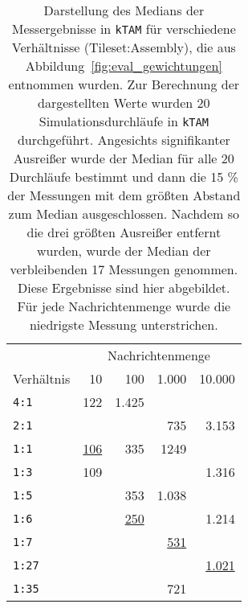 \begin{table}
    \centering
    \begin{tabular}{lrrrr}
         & \multicolumn{4}{c}{Nachrichtenmenge} \\
        Verhältnis & 10 & 100 & 1.000 & 10.000\\\hline 
        \texttt{4:1} & 122 & 1.425 &  &  \\
        \texttt{2:1} &  &  & 735 & 3.153 \\
        \texttt{1:1} & \underline{106} & 335 & 1249 &  \\
        \texttt{1:3} & 109 &  &  & 1.316 \\
        \texttt{1:5} &  & 353 & 1.038 &  \\
        \texttt{1:6} &  & \underline{250} &  & 1.214 \\
        \texttt{1:7} &  &  & \underline{531} &  \\
        \texttt{1:27} &  &  &  & \underline{1.021} \\
        \texttt{1:35} &  &  & 721 &   \\\hline
    \end{tabular}
    \caption[Simulationsergebnisse für verschiedene Gewichtungsverhältnisse]{Darstellung des Medians der Messergebnisse in \texttt{kTAM} für verschiedene Verhältnisse (Tileset:Assembly), die aus Abbildung~\ref{fig:eval_gewichtungen} entnommen wurden. Zur Berechnung der dargestellten Werte wurden 20 Simulationsdurchläufe in \texttt{kTAM} durchgeführt. Angesichts signifikanter Ausreißer wurde der Median für alle 20 Durchläufe bestimmt und dann die 15 \% der Messungen mit dem größten Abstand zum Median ausgeschlossen. Nachdem so die drei größten Ausreißer entfernt wurden, wurde der Median der verbleibenden 17 Messungen genommen. Diese Ergebnisse sind hier abgebildet. Für jede Nachrichtenmenge wurde die niedrigste Messung unterstrichen.}
    \label{tab:eval_weights}
\end{table}

